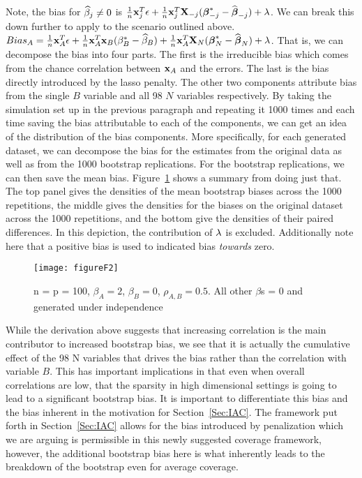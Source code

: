 Note, the bias for $\widehat{\beta}_j \neq 0$ is $\frac{1}{n}\mathbf{x}_j^T \epsilon + \frac{1}{n}\mathbf{x}_j^T \mathbf{X}_{-j}(\boldsymbol{\beta}^*_{-j} - \widehat{\boldsymbol{\beta}}_{-j}) + \lambda$. We can break this down further to apply to the scenario outlined above. $Bias_A = \frac{1}{n}\mathbf{x}_A^T \epsilon + \frac{1}{n}\mathbf{x}_A^T \mathbf{x}_{B}(\beta^*_{B} - \widehat{\beta}_{B}) + \frac{1}{n}\mathbf{x}_A^T \mathbf{X}_{N}(\boldsymbol{\beta}^*_{N} - \widehat{\boldsymbol{\beta}}_{N}) + \lambda$. That is, we can decompose the bias into four parts. The first is the irreducible bias which comes from the chance correlation between $\mathbf{x}_A$ and the errors. The last is the bias directly introduced by the lasso penalty. The other two components attribute bias from the single $B$ variable and all 98 $N$ variables respectively. By taking the simulation set up in the previous paragraph and repeating it 1000 times and each time saving the bias attributable to each of the components, we can get an idea of the distribution of the bias components. More specifically, for each generated dataset, we can decompose the bias for the estimates from the original data as well as from the 1000 bootstrap replications. For the bootstrap replications, we can then save the mean bias. Figure~\ref{fig:F2} shows a summary from doing just that. The top panel gives the densities of the mean bootstrap biases across the 1000 repetitions, the middle gives the densities for the biases on the original dataset across the 1000 repetitions, and the bottom give the densities of their paired differences. In this depiction, the contribution of $\lambda$ is excluded. Additionally note here that a positive bias is used to indicated bias \emph{towards} zero.

\begin{figure}[hbtp]
    \begin{center}
    \texttt{[image: figureF2]}
    \caption{\label{fig:F2} n = p = 100, $\beta_A = 2$, $\beta_B = 0$, $\rho_{A,B} = 0.5$.  All other $\beta$s = 0 and  generated under independence}
    \end{center}
\end{figure}

While the derivation above suggests that increasing correlation is the main contributor to increased bootstrap bias, we see that it is actually the cumulative effect of the 98 N variables that drives the bias rather than the correlation with variable $B$. This has important implications in that even when overall correlations are low, that the sparsity in high dimensional settings is going to lead to a significant bootstrap bias. It is important to differentiate this bias and the bias inherent in the motivation for Section~\ref{Sec:IAC}. The framework put forth in Section~\ref{Sec:IAC} allows for the bias introduced by penalization which we are arguing is permissible in this newly suggested coverage framework, however, the additional bootstrap bias here is what inherently leads to the breakdown of the bootstrap even for average coverage.

